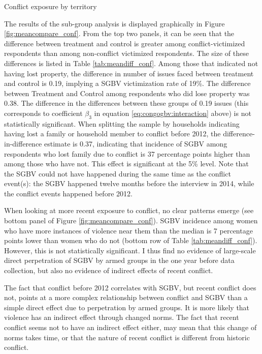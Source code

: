 \begin{table}[htb]
\centering
\caption{Conflict exposure by territory }
\label{tab:conflict_by_terr}

\end{table}

The results of the sub-group analysis is displayed graphically in Figure \ref{fig:meancompare_conf}. From the top two panels, it can be seen that the difference between treatment and control is greater among conflict-victimized respondents than among non-conflict victimized respondents. The size of these differences is listed in Table \ref{tab:meandiff_conf}. Among those that indicated not having lost property, the difference in number of issues faced between treatment and control is 0.19, implying a SGBV victimization rate of 19\%. The difference between Treatment and Control among respondents who did lose property was 0.38. The difference in the differences between these groups of 0.19 issues (this corresponds to coefficient $\beta_3$ in equation \ref{eq:congogbv:interaction} above) is not statistically significant. When splitting the sample by households indicating having lost a family or household member to conflict before 2012, the difference-in-difference estimate is 0.37, indicating that incidence of SGBV among respondents who lost family due to conflict is 37 percentage points higher than among those who have not. This effect is significant at the 5\% level. Note that the SGBV could not have happened during the same time as the conflict event(s): the SGBV happened twelve months before the interview in 2014, while the conflict events happened before 2012.

When looking at more recent exposure to conflict, no clear patterns emerge (see bottom panel of Figure \ref{fig:meancompare_conf}). SGBV incidence among women who have more instances of violence near them than the median is 7 percentage points lower than women who do not (bottom row of Table \ref{tab:meandiff_conf}). However, this is not statistically significant. I thus find no evidence of large-scale direct perpetration of SGBV by armed groups in the one year before data collection, but also no evidence of indirect effects of recent conflict. 

The fact that conflict before 2012 correlates with SGBV, but recent conflict does not, points at a more complex relationship between conflict and SGBV than a simple direct effect due to perpetration by armed groups. It is more likely that violence has an indirect effect through changed norms. The fact that recent conflict seems not to have an indirect effect either, may mean that this change of norms takes time, or that the nature of recent conflict is different from historic conflict. 

